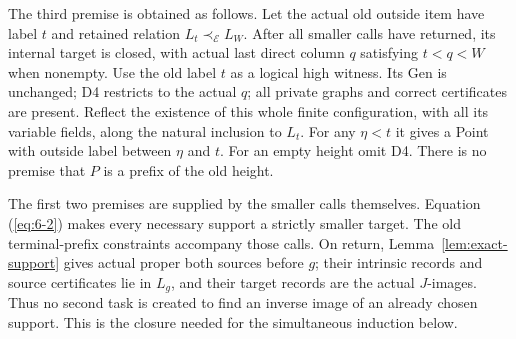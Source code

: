 The third premise is obtained as follows. Let the actual old outside
item have label $t$ and retained relation $L_t\prec_{\mathcal E}L_W$.
After all smaller calls have returned, its internal target is closed,
with actual last direct column $q$ satisfying $t<q<W$ when nonempty.
Use the old label $t$ as a logical high witness. Its Gen is unchanged;
D4 restricts to the actual $q$; all private graphs and correct
certificates are present. Reflect the existence of this whole finite
configuration, with all its variable fields, along the natural
inclusion to $L_t$. For any $\eta<t$ it gives a Point with outside
label between $\eta$ and $t$. For an empty height omit D4. There is
no premise that $P$ is a prefix of the old height.

The first two premises are supplied by the smaller calls themselves.
Equation (\ref{eq:6-2}) makes every necessary support a strictly smaller target.
The old terminal-prefix constraints accompany those calls. On return,
Lemma~\ref{lem:exact-support} gives actual proper both sources before
$g$; their intrinsic records and source certificates lie in $L_g$, and
their target records are the actual $J$-images. Thus no second task is
created to find an inverse image of an already chosen support. This
is the closure needed for the simultaneous induction below.
